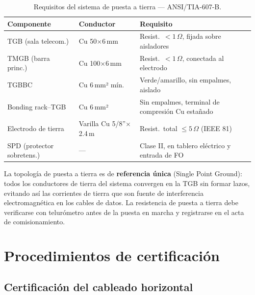 \begin{table}[H]
    \centering
    \caption{Requisitos del sistema de puesta a tierra — ANSI/TIA-607-B.}
    \label{tab:tierra_specs}
    \begin{tabular}{|p{4.5cm}|p{4cm}|p{5cm}|}
        \hline
        \textbf{Componente} & \textbf{Conductor} & \textbf{Requisito} \\
        \hline
        TGB (sala telecom.) & Cu 50$\times$6\,mm &
        Resist.\ $< 1\,\Omega$, fijada sobre aisladores \\
        \hline
        TMGB (barra princ.) & Cu 100$\times$6\,mm &
        Resist.\ $< 1\,\Omega$, conectada al electrodo \\
        \hline
        TGBBC               & Cu 6\,mm² mín.\ &
        Verde/amarillo, sin empalmes, aislado \\
        \hline
        Bonding rack--TGB   & Cu 6\,mm² &
        Sin empalmes, terminal de compresión Cu estañado \\
        \hline
        Electrodo de tierra & Varilla Cu 5/8''$\times$2.4\,m &
        Resist.\ total $\leq 5\,\Omega$ (IEEE 81) \\
        \hline
        SPD (protector sobretens.) & — &
        Clase II, en tablero eléctrico y entrada de FO \\
        \hline
    \end{tabular}
\end{table}

La topología de puesta a tierra es de \textbf{referencia única} (Single Point
Ground): todos los conductores de tierra del sistema convergen en la TGB sin
formar lazos, evitando así las corrientes de tierra que son fuente de
interferencia electromagnética en los cables de datos. La resistencia de puesta
a tierra debe verificarse con telurómetro antes de la puesta en marcha y
registrarse en el acta de comisionamiento.

\section{Procedimientos de certificación}
\label{sec:certificacion}

\subsection{Certificación del cableado horizontal}

